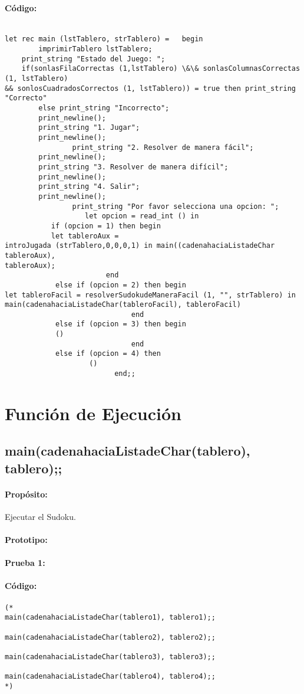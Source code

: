 \paragraph{Código:}
\begin{verbatim}

let rec main (lstTablero, strTablero) =   begin
        imprimirTablero lstTablero;
	print_string "Estado del Juego: ";
	if(sonlasFilaCorrectas (1,lstTablero) \&\& sonlasColumnasCorrectas (1, lstTablero) 
&& sonlosCuadradosCorrectos (1, lstTablero)) = true then print_string "Correcto"
		else print_string "Incorrecto";
		print_newline();
		print_string "1. Jugar";
		print_newline();
                print_string "2. Resolver de manera fácil";
		print_newline();
		print_string "3. Resolver de manera difícil";
		print_newline();
		print_string "4. Salir";
		print_newline();
                print_string "Por favor selecciona una opcion: ";
                   let opcion = read_int () in  
		   if (opcion = 1) then begin
		   let tableroAux =
introJugada (strTablero,0,0,0,1) in main((cadenahaciaListadeChar tableroAux),
tableroAux);
				        end
		    else if (opcion = 2) then begin
let tableroFacil = resolverSudokudeManeraFacil (1, "", strTablero) in
main(cadenahaciaListadeChar(tableroFacil), tableroFacil)
				              end
 		    else if (opcion = 3) then begin
		    ()
				              end
		    else if (opcion = 4) then 
                    ()
				          end;; 
\end{verbatim}

\section{Función de Ejecución}

\subsection{main(cadenahaciaListadeChar(tablero), tablero);; }

\paragraph{Propósito:} Ejecutar el Sudoku.
\paragraph{Prototipo:}
\paragraph{Prueba 1:}
\paragraph{Código:}
\begin{verbatim}
(*
main(cadenahaciaListadeChar(tablero1), tablero1);; 

main(cadenahaciaListadeChar(tablero2), tablero2);; 

main(cadenahaciaListadeChar(tablero3), tablero3);; 

main(cadenahaciaListadeChar(tablero4), tablero4);; 
*)
\end{verbatim}
